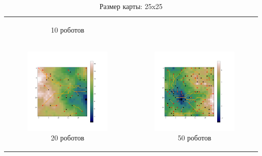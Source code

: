 \documentclass{article}
\begin{document}
\begin{table}[H]
\begin{tabular}{c c}
\begin{subfigure}{0.5\linewidth}
			\caption*{10 роботов}
			\end{subfigure}
			\\
            \begin{subfigure}{0.5\linewidth}
				\includegraphics[width = 1.0\columnwidth]{data/mean_paths/25x25/20.png}
			\caption*{20 роботов}
			\end{subfigure}
			&
			\begin{subfigure}{0.5\linewidth}
				\includegraphics[width = 1.0\columnwidth]{data/mean_paths/25x25/50.png}
			\caption*{50 роботов}
			\end{subfigure}
        \end{tabular}
        \caption*{Размер карты: 25x25}
	\end{table}
\end{document}
